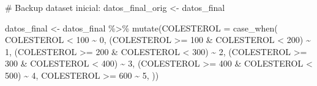 \documentclass[
]{article}
\newenvironment{Shaded}{\begin{snugshade}}{\end{snugshade}}
\newcommand{\AttributeTok}[1]{\textcolor[rgb]{0.80,0.80,0.80}{#1}}
\newcommand{\CommentTok}[1]{\textcolor[rgb]{0.50,0.62,0.50}{#1}}
\newcommand{\DecValTok}[1]{\textcolor[rgb]{0.86,0.86,0.80}{#1}}
\newcommand{\FunctionTok}[1]{\textcolor[rgb]{0.94,0.94,0.56}{#1}}
\newcommand{\NormalTok}[1]{\textcolor[rgb]{0.80,0.80,0.80}{#1}}
\newcommand{\OtherTok}[1]{\textcolor[rgb]{0.94,0.94,0.56}{#1}}
\newcommand{\SpecialCharTok}[1]{\textcolor[rgb]{0.86,0.64,0.64}{#1}}
\begin{document}
\begin{Shaded}
\begin{Highlighting}[]
\CommentTok{\# Backup dataset inicial:}
\NormalTok{datos\_final\_orig }\OtherTok{\textless{}{-}}\NormalTok{ datos\_final}

\NormalTok{datos\_final }\OtherTok{\textless{}{-}}\NormalTok{ datos\_final }\SpecialCharTok{\%\textgreater{}\%} \FunctionTok{mutate}\NormalTok{(}\AttributeTok{COLESTEROL =} \FunctionTok{case\_when}\NormalTok{(}
\NormalTok{  COLESTEROL }\SpecialCharTok{\textless{}} \DecValTok{100} \SpecialCharTok{\textasciitilde{}} \DecValTok{0}\NormalTok{,}
\NormalTok{  (COLESTEROL }\SpecialCharTok{\textgreater{}=} \DecValTok{100} \SpecialCharTok{\&}\NormalTok{ COLESTEROL }\SpecialCharTok{\textless{}} \DecValTok{200}\NormalTok{) }\SpecialCharTok{\textasciitilde{}} \DecValTok{1}\NormalTok{,}
\NormalTok{  (COLESTEROL }\SpecialCharTok{\textgreater{}=} \DecValTok{200} \SpecialCharTok{\&}\NormalTok{ COLESTEROL }\SpecialCharTok{\textless{}} \DecValTok{300}\NormalTok{) }\SpecialCharTok{\textasciitilde{}} \DecValTok{2}\NormalTok{,}
\NormalTok{  (COLESTEROL }\SpecialCharTok{\textgreater{}=} \DecValTok{300} \SpecialCharTok{\&}\NormalTok{ COLESTEROL }\SpecialCharTok{\textless{}} \DecValTok{400}\NormalTok{) }\SpecialCharTok{\textasciitilde{}} \DecValTok{3}\NormalTok{,}
\NormalTok{  (COLESTEROL }\SpecialCharTok{\textgreater{}=} \DecValTok{400} \SpecialCharTok{\&}\NormalTok{ COLESTEROL }\SpecialCharTok{\textless{}} \DecValTok{500}\NormalTok{) }\SpecialCharTok{\textasciitilde{}} \DecValTok{4}\NormalTok{,}
\NormalTok{  COLESTEROL }\SpecialCharTok{\textgreater{}=} \DecValTok{600} \SpecialCharTok{\textasciitilde{}} \DecValTok{5}\NormalTok{,}
\NormalTok{  ))}



\end{Highlighting}
\end{Shaded}
\end{document}
